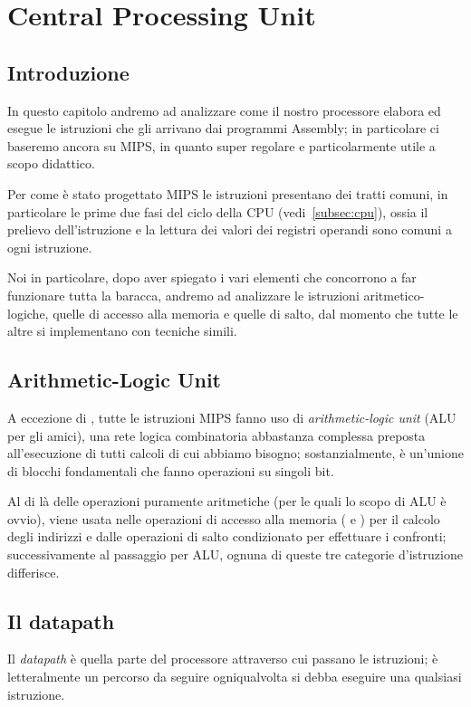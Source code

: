 \documentclass[class=book, crop=false, oneside]{standalone}
\begin{document}
\chapter{Central Processing Unit}

\section{Introduzione}
In questo capitolo andremo ad analizzare come il nostro processore elabora ed esegue le istruzioni che gli arrivano dai programmi Assembly; in particolare ci baseremo ancora su MIPS, in quanto super regolare e particolarmente utile a scopo didattico.

Per come è stato progettato MIPS le istruzioni presentano dei tratti comuni, in particolare le prime due fasi del ciclo della CPU (vedi~\ref{subsec:cpu}), ossia il prelievo dell'istruzione e la lettura dei valori dei registri operandi sono comuni a ogni istruzione.

Noi in particolare, dopo aver spiegato i vari elementi che concorrono a far funzionare tutta la baracca, andremo ad analizzare le istruzioni aritmetico-logiche, quelle di accesso alla memoria e quelle di salto, dal momento che tutte le altre si implementano con tecniche simili.

\section{Arithmetic-Logic Unit}
A eccezione di , tutte le istruzioni MIPS fanno uso di \emph{arithmetic-logic unit} (ALU per gli amici), una rete logica combinatoria abbastanza complessa preposta all'esecuzione di tutti calcoli di cui abbiamo bisogno; sostanzialmente, è un’unione di blocchi fondamentali che fanno operazioni su singoli bit.

Al di là delle operazioni puramente aritmetiche (per le quali lo scopo di ALU è ovvio), viene usata nelle operazioni di accesso alla memoria ( e ) per il calcolo degli indirizzi e dalle operazioni di salto condizionato per effettuare i confronti; successivamente al passaggio per ALU, ognuna di queste tre categorie d'istruzione differisce.

\section{Il datapath}
Il \emph{datapath} è quella parte del processore attraverso cui passano le istruzioni; è letteralmente un percorso da seguire ogniqualvolta si debba eseguire una qualsiasi istruzione.
\end{document}
